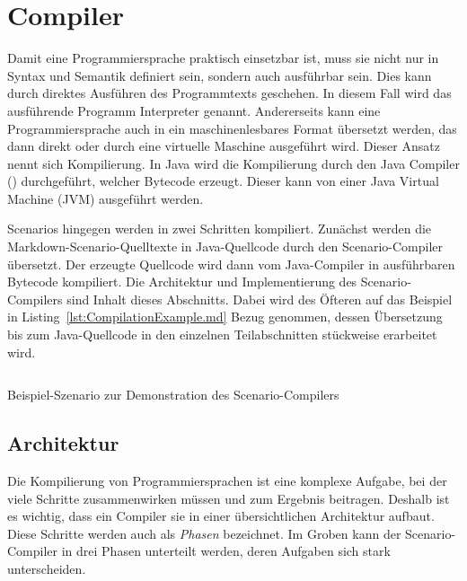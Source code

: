 \section{Compiler}\label{sec:compiler}

Damit eine Programmiersprache praktisch einsetzbar ist, muss sie nicht nur in Syntax und Semantik definiert sein, sondern auch ausführbar sein.
Dies kann durch direktes Ausführen des Programmtexts geschehen.
In diesem Fall wird das ausführende Programm Interpreter genannt.
Andererseits kann eine Programmiersprache auch in ein maschinenlesbares Format übersetzt werden,
das dann direkt oder durch eine virtuelle Maschine ausgeführt wird.
Dieser Ansatz nennt sich Kompilierung.
In Java wird die Kompilierung durch den Java Compiler () durchgeführt, welcher Bytecode erzeugt.
Dieser kann von einer Java Virtual Machine (JVM) ausgeführt werden.

Scenarios hingegen werden in zwei Schritten kompiliert.
Zunächst werden die Markdown-Scenario-Quelltexte in Java-Quellcode durch den Scenario-Compiler übersetzt.
Der erzeugte Quellcode wird dann vom Java-Compiler in ausführbaren Bytecode kompiliert.
Die Architektur und Implementierung des Scenario-Compilers sind Inhalt dieses Abschnitts.
Dabei wird des Öfteren auf das Beispiel in Listing~\ref{lst:CompilationExample.md} Bezug genommen,
dessen Übersetzung bis zum Java-Quellcode in den einzelnen Teilabschnitten stückweise erarbeitet wird.

\begin{listing}[htp]
    \centering
    \inputminted{md}{chapter/fulib-scenarios/scenarios/CompilationExample.md}
    \vspace{-3ex}
    \caption{Beispiel-Szenario zur Demonstration des Scenario-Compilers}
    \label{lst:CompilationExample.md}
\end{listing}

\subsection{Architektur}\label{subsec:compiler-architecture}

Die Kompilierung von Programmiersprachen ist eine komplexe Aufgabe,
bei der viele Schritte zusammenwirken müssen und zum Ergebnis beitragen.
Deshalb ist es wichtig, dass ein Compiler sie in einer übersichtlichen Architektur aufbaut.
Diese Schritte werden auch als \emph{Phasen}\cite[S.~4]{dragonbook} bezeichnet.
Im Groben kann der Scenario-Compiler in drei Phasen unterteilt werden,
deren Aufgaben sich stark unterscheiden.

